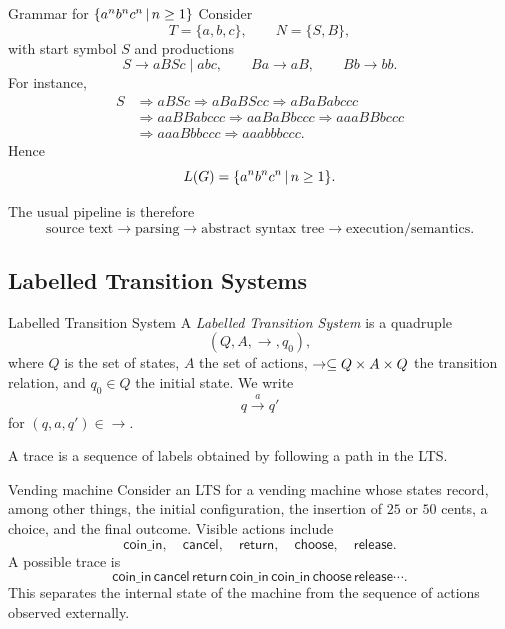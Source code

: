 \documentclass[a4paper]{article}
\newcommand{\trans}[1]{\xrightarrow{#1}}
\begin{document}
\begin{snippetexample}{Grammar for \(\{a^n b^n c^n\,|\, n\geq1\}\)}
    Consider
    \[
        T=\{a,b,c\},
        \qquad
        N=\{S,B\},
    \]
    with start symbol \(S\) and productions
    \[
        S\to aBSc\mid abc,
        \qquad
        Ba\to aB,
        \qquad
        Bb\to bb.
    \]
    For instance,
    \begin{align*}
        S&\Rightarrow aBSc
        \Rightarrow aBaBScc
        \Rightarrow aBaBabccc\\
        &\Rightarrow aaBBabccc
        \Rightarrow aaBaBbccc
        \Rightarrow aaaBBbccc\\
        &\Rightarrow aaaBbbccc
        \Rightarrow aaabbbccc.
    \end{align*}
    Hence
    \[
        L(G)=\{a^n b^n c^n\,|\, n\geq1\}.
    \]
\end{snippetexample}

The usual pipeline is therefore
\[
    \text{source text}
    \longrightarrow
    \text{parsing}
    \longrightarrow
    \text{abstract syntax tree}
    \longrightarrow
    \text{execution/semantics}.
\]

\subsection{Labelled Transition Systems}

\begin{snippetdefinition}{Labelled Transition System}
    A \emph{Labelled Transition System} is a quadruple
    \[
        (Q,A,\to,q_0),
    \]
    where \(Q\) is the set of states, \(A\) the set of actions,
    \(\to\subseteq Q\times A\times Q\) the transition relation, and \(q_0\in Q\) the initial state.
    We write
    \[
        q\trans{a}q'
    \]
    for \((q,a,q')\in\to\).
\end{snippetdefinition}

A trace is a sequence of labels obtained by following a path in the LTS.

\begin{snippetexample}{Vending machine}
    Consider an LTS for a vending machine whose states record, among other things, the initial configuration, the insertion of \(25\) or \(50\) cents, a choice, and the final outcome.
    Visible actions include
    \[
        \mathsf{coin\_in},\quad
        \mathsf{cancel},\quad
        \mathsf{return},\quad
        \mathsf{choose},\quad
        \mathsf{release}.
    \]
    A possible trace is
    \[
        \mathsf{coin\_in}\,\mathsf{cancel}\,\mathsf{return}\,
        \mathsf{coin\_in}\,\mathsf{coin\_in}\,\mathsf{choose}\,\mathsf{release}\cdots.
    \]
    This separates the internal state of the machine from the sequence of actions observed externally.
\end{snippetexample}
\end{document}

